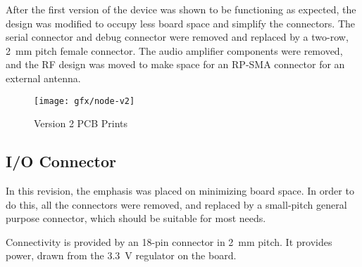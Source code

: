After the first version of the device was shown to be functioning as expected,
the design was modified to occupy less board space and simplify the connectors.
The serial connector and debug connector were removed and replaced by a two-row,
\SI{2}{mm} pitch female connector. The audio amplifier components were removed,
and the RF design was moved to make space for an RP-SMA connector for an
external antenna.

\begin{figure}[htb]
  \begin{center}
    \texttt{[image: gfx/node-v2]}
  \end{center}
  \caption{Version 2 PCB Prints}
  \label{fig:v2-prints}
\end{figure}

\subsection{I/O Connector}\label{sub:io-connector}

In this revision, the emphasis was placed on minimizing board space. In order to
do this, all the connectors were removed, and replaced by a small-pitch general
purpose connector, which should be suitable for most needs.

Connectivity is provided by an 18-pin connector in \SI{2}{mm} pitch. It provides
power, drawn from the \SI{3.3}{V} regulator on the board. 


